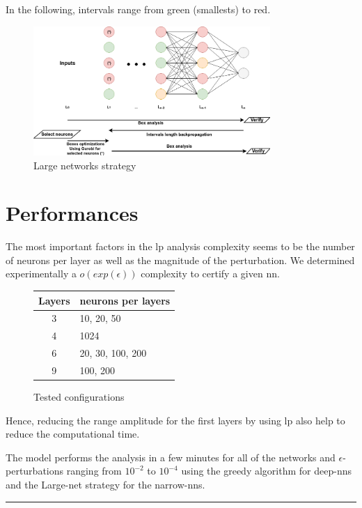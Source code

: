 \documentclass[8pt,a4paper]{article}
\begin{document}
\noindent In the following, intervals range from green (smallests) to red.

\begin{figure}[H]
\begin{center}
\includegraphics[width=9cm]{NN_lastlayer.png}
\caption{Large networks strategy}
\end{center}
\end{figure}

\section{Performances}

The most important factors in the \gls{lp} analysis complexity seems to be the number of neurons per layer as well as the magnitude of the perturbation. We determined experimentally a $o(exp(\epsilon))$ complexity to certify a given \gls{nn}. 
\begin{figure}
	\vspace{-20pt}
	\begin{center}
		\small
		\begin{tabular}{| c || l | }
			Layers & neurons per layers \\
			\hline
			3 & 10, 20, 50 \\
			4 & 1024 \\
			6 & 20, 30, 100, 200 \\
			9 & 100, 200 \\
		\end{tabular}
	\end{center}
	\vspace{-11pt}
	\caption{Tested configurations}
	\vspace{-10pt}
\end{figure}
Hence, reducing the range amplitude for the first layers by using \gls{lp} also help to reduce the computational time.

\noindent The model performs the analysis in a few minutes for all of the networks and $\epsilon$-perturbations ranging from $10^{-2}$ to $10^{-4}$ using the greedy algorithm for deep-\gls{nn}s and the Large-net strategy for the narrow-\gls{nn}s.

\vfill
\hrule
\end{document}
